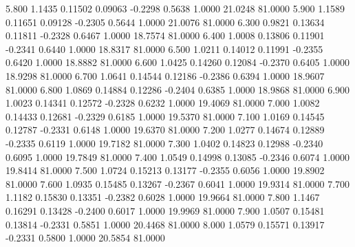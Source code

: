    5.800   1.1435   0.11502   0.09063  -0.2298   0.5638   1.0000  21.0248  81.0000
   5.900   1.1589   0.11651   0.09128  -0.2305   0.5644   1.0000  21.0076  81.0000
   6.300   0.9821   0.13634   0.11811  -0.2328   0.6467   1.0000  18.7574  81.0000
   6.400   1.0008   0.13806   0.11901  -0.2341   0.6440   1.0000  18.8317  81.0000
   6.500   1.0211   0.14012   0.11991  -0.2355   0.6420   1.0000  18.8882  81.0000
   6.600   1.0425   0.14260   0.12084  -0.2370   0.6405   1.0000  18.9298  81.0000
   6.700   1.0641   0.14544   0.12186  -0.2386   0.6394   1.0000  18.9607  81.0000
   6.800   1.0869   0.14884   0.12286  -0.2404   0.6385   1.0000  18.9868  81.0000
   6.900   1.0023   0.14341   0.12572  -0.2328   0.6232   1.0000  19.4069  81.0000
   7.000   1.0082   0.14433   0.12681  -0.2329   0.6185   1.0000  19.5370  81.0000
   7.100   1.0169   0.14545   0.12787  -0.2331   0.6148   1.0000  19.6370  81.0000
   7.200   1.0277   0.14674   0.12889  -0.2335   0.6119   1.0000  19.7182  81.0000
   7.300   1.0402   0.14823   0.12988  -0.2340   0.6095   1.0000  19.7849  81.0000
   7.400   1.0549   0.14998   0.13085  -0.2346   0.6074   1.0000  19.8414  81.0000
   7.500   1.0724   0.15213   0.13177  -0.2355   0.6056   1.0000  19.8902  81.0000
   7.600   1.0935   0.15485   0.13267  -0.2367   0.6041   1.0000  19.9314  81.0000
   7.700   1.1182   0.15830   0.13351  -0.2382   0.6028   1.0000  19.9664  81.0000
   7.800   1.1467   0.16291   0.13428  -0.2400   0.6017   1.0000  19.9969  81.0000
   7.900   1.0507   0.15481   0.13814  -0.2331   0.5851   1.0000  20.4468  81.0000
   8.000   1.0579   0.15571   0.13917  -0.2331   0.5800   1.0000  20.5854  81.0000
